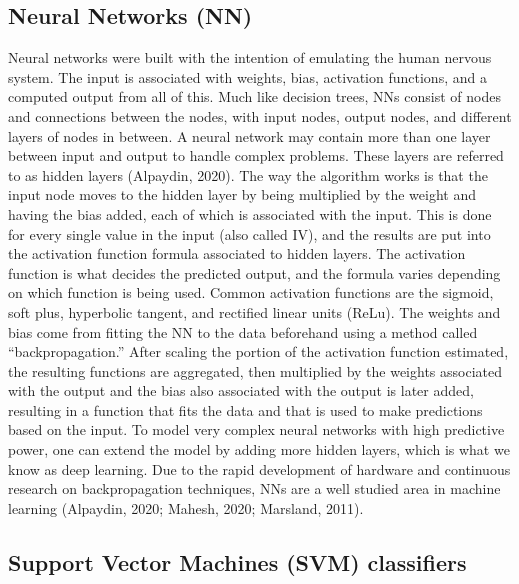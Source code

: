 \documentclass[
  man]{apa7}
\begin{document}
\hypertarget{neural-networks-nn}{%
\subsection{Neural Networks (NN)}\label{neural-networks-nn}}

Neural networks were built with the intention of emulating the human nervous system. The input is associated with weights, bias, activation functions, and a computed output from all of this. Much like decision trees, NNs consist of nodes and connections between the nodes, with input nodes, output nodes, and different layers of nodes in between. A neural network may contain more than one layer between input and output to handle complex problems. These layers are referred to as hidden layers (Alpaydin, 2020).
The way the algorithm works is that the input node moves to the hidden layer by being multiplied by the weight and having the bias added, each of which is associated with the input. This is done for every single value in the input (also called IV), and the results are put into the activation function formula associated to hidden layers. The activation function is what decides the predicted output, and the formula varies depending on which function is being used. Common activation functions are the sigmoid, soft plus, hyperbolic tangent, and rectified linear units (ReLu). The weights and bias come from fitting the NN to the data beforehand using a method called ``backpropagation.'' After scaling the portion of the activation function estimated, the resulting functions are aggregated, then multiplied by the weights associated with the output and the bias also associated with the output is later added, resulting in a function that fits the data and that is used to make predictions based on the input.
To model very complex neural networks with high predictive power, one can extend the model by adding more hidden layers, which is what we know as deep learning. Due to the rapid development of hardware and continuous research on backpropagation techniques, NNs are a well studied area in machine learning (Alpaydin, 2020; Mahesh, 2020; Marsland, 2011).

\hypertarget{support-vector-machines-svm-classifiers}{%
\subsection{Support Vector Machines (SVM) classifiers}\label{support-vector-machines-svm-classifiers}}
\end{document}
